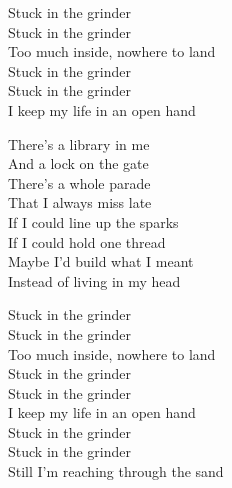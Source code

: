 \begin{lyrics}
Stuck in the grinder\\
Stuck in the grinder\\
Too much inside, nowhere to land\\
Stuck in the grinder\\
Stuck in the grinder\\
I keep my life in an open hand

There’s a library in me\\
And a lock on the gate\\
There’s a whole parade\\
That I always miss late\\
If I could line up the sparks\\
If I could hold one thread\\
Maybe I’d build what I meant\\
Instead of living in my head

Stuck in the grinder\\
Stuck in the grinder\\
Too much inside, nowhere to land\\
Stuck in the grinder\\
Stuck in the grinder\\
I keep my life in an open hand\\
Stuck in the grinder\\
Stuck in the grinder\\
Still I’m reaching through the sand
\end{lyrics}
